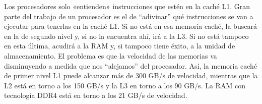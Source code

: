 \documentclass{article}
\begin{document}
Los procesadores solo «entienden» instrucciones que estén en la caché L1. Gran parte del trabajo de un procesador es el de “adivinar” qué instrucciones se van a ejecutar para tenerlas en la caché L1. Si no está en esa memoria caché, la buscará en la de segundo nivel y, si no la encuentra ahí, irá a la L3. Si no está tampoco en esta última, acudirá a la RAM y, si tampoco tiene éxito, a la unidad de almacenamiento.\newline
El problema es que la velocidad de las memorias va disminuyendo a medida que nos “alejamos” del procesador. Así, la memoria caché de primer nivel L1 puede alcanzar más de 300 GB/s de velocidad, mientras que la L2 está en torno a los 150 GB/s y la L3 en torno a los 90 GB/s. La RAM con tecnología DDR4 está en torno a los 21 GB/s de velocidad.\cite{Intel}




\end{document}
